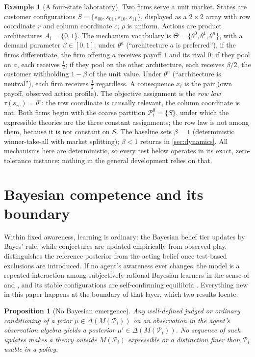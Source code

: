 \documentclass[11pt]{article}
\newtheorem{proposition}[assumption]{Proposition}
\theoremstyle{definition}
\newtheorem{example}{Example}
\begin{document}
\begin{example}[A four-state laboratory]
\label{ex:setup}
Two firms serve a unit market.
States are customer configurations $S=\{s_{00},s_{01},s_{10},s_{11}\}$, displayed as a $2\times2$ array with row coordinate $r$ and column coordinate $c$; $\rho$ is uniform.
Actions are product architectures $A_i=\{0,1\}$.
The mechanism vocabulary is $\Theta=\{\theta^0,\theta^1,\theta^n\}$, with a demand parameter $\beta\in[0,1]$: under $\theta^a$ (``architecture $a$ is preferred''), if the firms differentiate, the firm offering $a$ receives payoff $1$ and its rival $0$; if they pool on $a$, each receives $\tfrac12$; if they pool on the other architecture, each receives $\beta/2$, the customer withholding $1-\beta$ of the unit value.
Under $\theta^n$ (``architecture is neutral''), each firm receives $\tfrac12$ regardless.
A consequence $x_i$ is the pair (own payoff, observed action profile).
The objective assignment is the \emph{row law} $\tau(s_{rc})=\theta^{r}$: the row coordinate is causally relevant, the column coordinate is not.
Both firms begin with the coarse partition $\mathcal P_i^0=\{S\}$, under which the expressible theories are the three constant assignments; the row law is not among them, because it is not constant on $S$.
The baseline sets $\beta=1$ (deterministic winner-take-all with market splitting); $\beta<1$ returns in \cref{sec:dynamics}.
All mechanisms here are deterministic, so every test below operates in its exact, zero-tolerance instance; nothing in the general development relies on that.
\end{example}
\section{Bayesian competence and its boundary}
\label{sec:bayesian}

Within fixed awareness, learning is ordinary: the Bayesian belief tier updates by Bayes' rule, while conjectures are updated empirically from observed play.
 distinguishes the reference posterior from the acting belief once test-based exclusions are introduced.
If no agent's awareness ever changes, the model is a repeated interaction among subjectively rational Bayesian learners in the sense of \citet{KalaiLehrer1993b} and \citet{Ryall2003}, and its stable configurations are self-confirming equilibria \citep{FudenbergLevine1993}.
Everything new in this paper happens at the boundary of that layer, which two results locate.

\begin{proposition}[No Bayesian emergence]
\label{prop:no-emergence}
Any well-defined judged or ordinary conditioning of a prior $\mu\in\Delta(M(\mathcal P_i))$ on an observation in the agent's observation algebra yields a posterior $\mu'\in\Delta(M(\mathcal P_i))$.
No sequence of such updates makes a theory outside $M(\mathcal P_i)$ expressible or a distinction finer than $\mathcal P_i$ usable in a policy.
\end{proposition}
\end{document}
